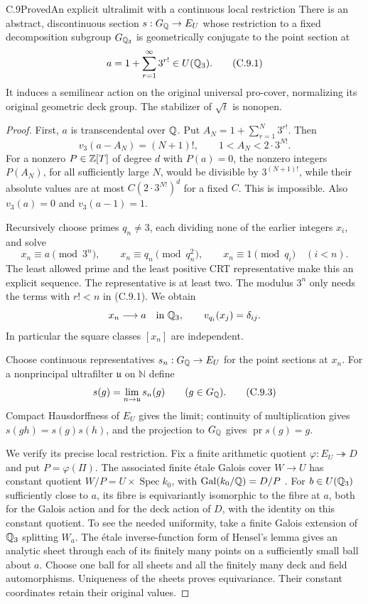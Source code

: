 \begin{statement}{C.9}{Proved}{An explicit ultralimit with a continuous local restriction}
There is an abstract, discontinuous section
$s:G_\mathbb Q\to E_U$ whose restriction to a fixed decomposition
subgroup $G_{\mathbb Q_3}$ is geometrically conjugate to the point
section at
\[
 a=1+\sum_{r=1}^{\infty}3^{r!}\in U(\mathbb Q_3).
 \tag{C.9.1}
\]
It induces a semilinear action on the original universal pro-cover,
normalizing its original geometric deck group. The stabilizer of
$\sqrt t$ is nonopen.
\end{statement}
\begin{proof}
First, $a$ is transcendental over $\mathbb Q$. Put
$A_N=1+\sum_{r=1}^N3^{r!}$. Then
\[
 v_3(a-A_N)=(N+1)!,\qquad 1<A_N<2\cdot3^{N!}.
\]
For a nonzero $P\in\mathbb Z[T]$ of degree $d$ with $P(a)=0$,
the nonzero integers $P(A_N)$, for all sufficiently large $N$,
would be divisible by $3^{(N+1)!}$, while their absolute values
are at most $C(2\cdot3^{N!})^d$ for a fixed $C$. This is
impossible. Also $v_3(a)=0$ and $v_3(a-1)=1$.

Recursively choose primes $q_n\ne3$, each dividing none of the
earlier integers $x_i$, and solve
\[
 x_n\equiv a\pmod{3^n},\qquad
 x_n\equiv q_n\pmod{q_n^2},\qquad
 x_n\equiv1\pmod{q_i}\quad(i<n).
 \tag{C.9.2}
\]
The least allowed prime and the least positive CRT representative
make this an explicit sequence. The representative is at least
two. The modulus $3^n$ only needs the terms with $r!<n$ in
(C.9.1). We obtain
\[
 x_n\longrightarrow a\quad\hbox{in }\mathbb Q_3,
 \qquad v_{q_i}(x_j)=\delta_{ij}.
\]
In particular the square classes $[x_n]$ are independent.

Choose continuous representatives $s_n:G_\mathbb Q\to E_U$ for the
point sections at $x_n$. For a nonprincipal ultrafilter
$\mathfrak u$ on $\mathbb N$ define
\[
 s(g)=\lim_{n\to\mathfrak u}s_n(g)\qquad(g\in G_\mathbb Q).
 \tag{C.9.3}
\]
Compact Hausdorffness of $E_U$ gives the limit; continuity of
multiplication gives $s(gh)=s(g)s(h)$, and the projection to
$G_\mathbb Q$ gives $\operatorname{pr}s(g)=g$.

We verify its precise local restriction. Fix a finite arithmetic
quotient $\varphi:E_U\twoheadrightarrow D$ and put
$P=\varphi(\Pi)$. The associated finite \'etale Galois cover
$W\to U$ has constant quotient
$W/P=U\times\operatorname{Spec}k_0$, with
$\operatorname{Gal}(k_0/\mathbb Q)=D/P$
\cite[Expos\'e IX, \S6]{AgentSGA1}.
For $b\in U(\mathbb Q_3)$ sufficiently close to $a$, its fibre is
equivariantly isomorphic to the fibre at $a$, both for the
Galois action and for the deck action of $D$, with the identity
on this constant quotient. To see the needed uniformity, take a
finite Galois extension of $\mathbb Q_3$ splitting $W_a$. The \'etale
inverse-function form of Hensel's lemma gives an analytic sheet
through each of its finitely many points on a sufficiently small
ball about $a$. Choose one ball for all sheets and all the
finitely many deck and field automorphisms. Uniqueness of the
sheets proves equivariance. Their constant coordinates retain
their original values.


\end{proof}
